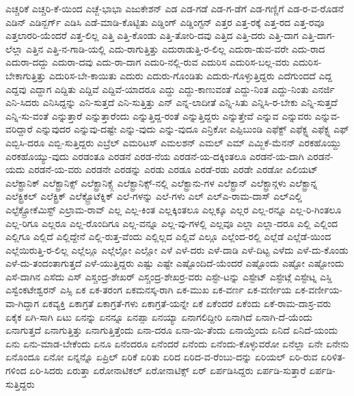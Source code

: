 {ಎಚ್ಚರಿಕೆ
ಎಚ್ಚರಿ-ಕೆ-ಯಿಂದ
ಎಚ್ಜೆ-ಭಾಭಾ
ಎಜುಕೇಶನ್
ಎಡ
ಎಡ-ಗಡೆ
ಎಡ-ಗ-ಡೆಗೆ
ಎಡ-ಗಣ್ಣಿಗೆ
ಎಡ-ರ-ವ-ರೊಡನೆ
ಎಡಿನ್
ಎಡಿನ್ಬರ್ಗ್
ಎಡಿಸಿ
ಎಡೆ-ಮಾಡಿ-ಕೊಟ್ಟಿತು
ಎಡ್ಡಿಂಗ್
ಎಡ್ಡಿಂಗ್ಟನ್
ಎತ್ತರ
ಎತ್ತ-ರಕ್ಕೆ
ಎತ್ತ-ರದ
ಎತ್ತ-ರವೂ
ಎತ್ತಲಾರರಿ-ಯೆಂದರೆ
ಎತ್ತ-ಲಿಲ್ಲ
ಎತ್ತಿ
ಎತ್ತಿ-ಕೊಂಡು
ಎತ್ತಿ-ತೋರಿ-ದವು
ಎತ್ತಿದ
ಎತ್ತಿ-ದರು
ಎತ್ತಿ-ದಾಗ
ಎತ್ತಿ-ದಾಗ-ಲೆಲ್ಲಾ
ಎತ್ತಿನ
ಎತ್ತಿ-ನ-ಗಾಡಿ-ಯಲ್ಲಿ
ಎದು-ರಾಗುತ್ತಿತ್ತು
ಎದುರಾಡುತ್ತಿ-ರ-ಲಿಲ್ಲ
ಎದುರಾ-ಡುವ-ವರೇ
ಎದು-ರಾದ
ಎದುರಾ-ದದ್ದು
ಎದುರಾ-ದವು
ಎದು-ರಾ-ದಾಗ
ಎದುರಿ-ನಲ್ಲಿ-ರುವ
ಎದುರಿಸ
ಎದುರಿಸ-ಬಲ್ಲ-ವರು
ಎದುರಿಸ-ಬೇಕಾಗುತ್ತಿತ್ತು
ಎದುರಿಸ-ಬೇ-ಕಾಯಿತು
ಎದುರು
ಎದುರು-ಗೊಂಡಿತು
ಎದುರು-ಗೊಳ್ಳುತ್ತಿದ್ದರು
ಎದೆಗುಂದದೆ
ಎದ್ದ
ಎದ್ದವು
ಎದ್ದಾಗ
ಎದ್ದಿತು
ಎದ್ದಿವೆ
ಎದ್ದಿವೆ-ಯಾದರೂ
ಎದ್ದು
ಎದ್ದು-ಕಾಣುವಂತೆ
ಎದ್ದು-ನಿಂತ
ಎದ್ದು-ನಿಂತು
ಎನರ್ಜಿ
ಎನಿ-ಸಿದರು
ಎನಿಸಿದ್ದನ್ನು
ಎನಿ-ಸುತ್ತದೆ
ಎನಿ-ಸುತ್ತಿತ್ತು
ಎನ್
ಎನ್ನ-ಲಾದೀತೆ
ಎನ್ನಿ-ಸಿತು
ಎನ್ನಿಸಿ-ರ-ಬೇಕು
ಎನ್ನಿ-ಸುತ್ತದೆ
ಎನ್ನಿ-ಸು-ವಂತೆ
ಎನ್ನುತ್ತಾರೆ
ಎನ್ನುತ್ತಾರೆಂದು
ಎನ್ನುತ್ತಿದ್ದ-ರಂತೆ
ಎನ್ನುತ್ತಿದ್ದರು
ಎನ್ನುತ್ತೇವೆ
ಎನ್ನುವ
ಎನ್ನುವರು
ಎನ್ನುವ-ವರಿದ್ದಾರೆ
ಎನ್ನುವುದರ
ಎನ್ನುವು-ದಷ್ಟೇ
ಎನ್ನು-ವುದು
ಎನ್ನು-ವುದೂ
ಎನ್ರಿಕೋ
ಎಪ್ಪಿಬುಂಡಿ
ಎಫೆಕ್ಟ್
ಎಫೆಕ್ಟ್ನ
ಎಫೆಕ್ಟ್ನ
ಎಫ್
ಎಬ್ಬಿಸಿ-ದರೂ
ಎಬ್ಬಿ-ಸುತ್ತಿದ್ದರು
ಎಬ್ರೆಲ್
ಎಮರಿಟಸ್
ಎಮಲಶನ್
ಎಮಲ್
ಎಮ್
ಎಮ್ಜಿಕೆ-ಮೆನನ್
ಎರಕಹೊಯ್ದು
ಎರಕಹೊಯ್ಯು-ವುದು
ಎರಡಂತೂ
ಎರಡನೆ
ಎರಡ-ನೆಯ
ಎರಡನೆ-ಯ-ದಕ್ಕಿಂತಲೂ
ಎರಡನೆ-ಯ-ದಾಗಿ
ಎರಡನೆ-ಯದು
ಎರಡನೆ-ಯ-ವರು
ಎರಡನೇ
ಎರಡನ್ನು
ಎರಡು
ಎರಡೂ
ಎರಡೆ-ರಡು
ಎರಡೇ
ಎರಡೋ
ಎಲಿಯಟ್
ಎಲೆಕ್ಟ್ರಾನಿಕ್
ಎಲೆಕ್ಟ್ರಾನಿಕ್ಸ್
ಎಲೆಕ್ಟ್ರಾನಿಕ್ಸ್ಗೆ
ಎಲೆಕ್ಟ್ರಾನಿಕ್ಸ್-ನಲ್ಲಿ
ಎಲೆಕ್ಟ್ರಾನು-ಗಳ
ಎಲೆಕ್ಟ್ರಾನ್
ಎಲೆಕ್ಟ್ರಾನ್ಗಳು
ಎಲೆಕ್ಟ್ರಾನ್ನ
ಎಲೆಕ್ಟ್ರಿಕಲ್
ಎಲೆಕ್ಟ್ರಿಕ್
ಎಲೆಕ್ಟ್ರೊಟೆಕ್ನಿಕ್
ಎಲೆ-ಗಳನ್ನು
ಎಲೆ-ಗಳು
ಎಲ್
ಎಲ್ಎ-ರಾಮ-ದಾಸ್
ಎಲ್ಎಲ್ಡಿ
ಎಲ್ಟೆಕ್ಟ್ರೋಕೆಮಿಸ್ಟ್
ಎಲ್ರಾಮ-ರಾವ್
ಎಲ್ಲ
ಎಲ್ಲ-ಕಿಂತ
ಎಲ್ಲಕ್ಕಿಂತಲೂ
ಎಲ್ಲಕ್ಕೂ
ಎಲ್ಲರ
ಎಲ್ಲ-ರನ್ನೂ
ಎಲ್ಲ-ರಿ-ಗಿಂತಲೂ
ಎಲ್ಲ-ರಿಗೂ
ಎಲ್ಲರೂ
ಎಲ್ಲ-ರೊಂದಿಗೂ
ಎಲ್ಲ-ವನ್ನೂ
ಎಲ್ಲ-ವು-ಗಳಲ್ಲಿ
ಎಲ್ಲವೂ
ಎಲ್ಲಾ
ಎಲ್ಲಾ-ದರೂ
ಎಲ್ಲಿ
ಎಲ್ಲಿಂದ
ಎಲ್ಲಿಗೂ
ಎಲ್ಲಿದೆ
ಎಲ್ಲಿದ್ದೇನೆ
ಎಲ್ಲಿ-ರುತ್ತ-ವೆಂದು
ಎಲ್ಲಿಲ್ಲದ
ಎಲ್ಲಿವೆ
ಎಲ್ಲೂ
ಎಲ್ಲೆಂದ-ರಲ್ಲಿ
ಎಲ್ಲೆಡೆ
ಎಲ್ಲೆಡೆ-ಯಿಂದ
ಎಲ್ಲೆಯಿರುತ್ತಿ-ರ-ಲಿಲ್ಲ
ಎಲ್ಲೆಲ್ಲೂ
ಎಲ್ಲೆಲ್ಲೋ
ಎಲ್ಲೋ
ಎಳೆ
ಎಳೆ-ದರು
ಎಳೆ-ದಾಡಿ
ಎಳೆ-ದಿಟ್ಟ
ಎಳೆದು
ಎಳೆ-ದು-ಕೊಂಡು
ಎಳೆ-ದು-ತಂದಂತಾಗುತ್ತದೆ
ಎಳೆ-ಯುತ್ತಿದ್ದರು
ಎಷ್ಟು
ಎಷ್ಟೇ
ಎಷ್ಟೊಂದಿದೆ-ಯೆಂದರೆ
ಎಷ್ಟೊಂದು
ಎಷ್ಟೋ
ಎಷ್ಟೋಂದು
ಎಸೆ-ದಾಗಿನ
ಎಸೆದು
ಎಸ್
ಎಸ್ಚಂದ್ರ-ಶೇಖರ್
ಎಸ್ಚಂದ್ರ-ಶೇಖರ್ರ-ವರು
ಎಸ್ಟೇ-ಟನ್ನು
ಎಸ್ಟೇಟ್
ಎಸ್ಟೇಟ್ಗೆ
ಎಸ್ಟೇಟ್ನ
ಎಸ್ಡಿ
ಎಸ್ವೆಂಕಟೇಶ್ವರನ್
ಎಸ್ಸಿ
ಏಕ
ಏಕ-ತರಂಗ
ಏಕಮನಸ್ಕ-ರಾಗಿ
ಏಕ-ಮುಖ
ಏಕ-ವರ್ಣ
ಏಕ-ವರ್ಣೀಯ
ಏಕ-ವರ್ಣೀಯ-ವಾ-ಗಿದ್ದಾಗ
ಏಕವ್ಯಕ್ತಿ
ಏಕಾಗ್ರತೆ
ಏಕಾಗ್ರತೆ-ಗಳು
ಏಕಾಗ್ರತೆ-ಯನ್ನೇ
ಏಕೆ
ಏಕೆಂದರೆ
ಏಕೆಂದು
ಏಕೆ-ರಾಮ-ದಾಸ್ರ-ವರು
ಏಕೈಕ
ಏಗಿ-ಸಾಗಿ
ಏಟು
ಏನನ್ನು
ಏನನ್ನೂ
ಏನಪ್ಪಾ
ಏನಯ್ಯಾ
ಏನಾಗಲಿದ್ದೀರಿ
ಏನಾಗಿದೆ
ಏನಾಗಿ-ದೆ-ಯೆಂದು
ಏನಾಗುತ್ತದೆ
ಏನಾಗುತ್ತಿತ್ತು
ಏನಾಗುತ್ತಿತ್ತೆಂದು
ಏನಾ-ದರೂ
ಏನಾ-ಯಿ-ತೆಂದು
ಏನಾಯ್ತೆಂದು
ಏನಿದೆ
ಏನಿದೆ-ಯಂದು
ಏನು
ಏನು-ಮಾಡ-ಬೇಕೆಂದು
ಏನೂ
ಏನೆಂದರೂ
ಏನೆಂದರೆ
ಏನೆಂದು
ಏನೆಂದು-ಕೊಳ್ಳುವರೋ
ಏನೆಲ್ಲಾ
ಏನೇ
ಏನೇನು
ಏನೊಂದೂ
ಏನೋ
ಏನ್ನನ್ನೊ
ಏಪ್ರಿಲ್
ಏರಿಕೆ
ಏರಿತು
ಏರಿದ
ಏರಿದ-ವ-ರೆಂಬು-ದನ್ನು
ಏರಿಯಲ್
ಏರಿ-ರುವ
ಏರಿಳಿತ-ಗಳಿಂದ
ಏರಿ-ಸಿದರು
ಏರುತ್ತಾ
ಏರೋನಾಟಿಕಲ್
ಏರೋನಾಟಿಕ್ಸ್
ಏರ್
ಏರ್ಪಡಿಸಿದ್ದರು
ಏರ್ಪಡಿ-ಸುತ್ತಾರೆ
ಏರ್ಪಡಿ-ಸುತ್ತಿದ್ದರು
}
